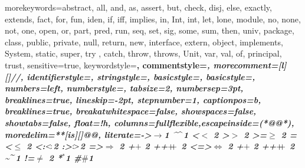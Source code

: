 {morekeywords={abstract, all, and, as, assert, but, check, disj, else, exactly, extends, fact, for, fun, iden, if, iff, implies, in, Int, int, let, lone, module, no, none, not, one, open, or, part, pred, run, seq, set, sig, some, sum, then, univ, package, class, public, private, null, return, new, interface, extern, object, implements, System, static, super, try , catch, throw, throws, Unit, var, val, of, principal, trust},
sensitive=true,
keywordstyle=\bfseries\color{green!40!black},
commentstyle=\itshape\color{purple!40!black},
morecomment=[l][\small\itshape\color{purple!40!black}]{//},
identifierstyle=\color{blue},
stringstyle=\color{orange},
basicstyle=\small,
basicstyle={\small\ttfamily},
numbers=left,
numberstyle=\tiny\color{mygray},
tabsize=2,
numbersep=3pt,
breaklines=true,
lineskip=-2pt,
stepnumber=1,
captionpos=b,
breaklines=true,
breakatwhitespace=false,
showspaces=false,
showtabs=false,
float=!h,
columns=fullflexible,escapeinside={(*@}{@*)},
moredelim=**[is][\color{red!60}]{@}{@},
literate={->}{{$\to$}}1 {^}{{$\mspace{-3mu}\widehat{\quad}\mspace{-3mu}$}}1
{<}{$<$ }2 {>}{$>$ }2 {>=}{$\geq$ }2 {=<}{$\leq$ }2
{<:}{{$<\mspace{-3mu}:$}}2 {:>}{{$:\mspace{-3mu}>$}}2
{=>}{{$\Rightarrow$ }}2 {+}{$+$ }2 {++}{{$+\mspace{-8mu}+$ }}2
{<=>}{{$\Leftrightarrow$ }}2 {+}{$+$ }2 {++}{{$+\mspace{-8mu}+$ }}2
{\~}{{$\mspace{-3mu}\widetilde{\quad}\mspace{-3mu}$}}1
{!=}{$\neq$ }2 {*}{${}^{\ast}$}1 %
{\#}{$\#$}1
}
\lstset{language=Java,numbersep=5pt,frame=single}

\DeclareMathOperator\niff{\ensuremath{\nLeftrightarrow}}

\DeclareMathOperator\ceq{\ensuremath{\mathrel{\simeq_{\mi{ctx}}}}}
\DeclareMathOperator\nceq{\mathrel{\not\simeq_{\mi{ctx}}}}

\DeclareMathOperator\ceqs{\src{\ceq}}
\DeclareMathOperator\ceqt{\trg{\ceq}}
\DeclareMathOperator\ceqc{\com{\ceq}}

\DeclareMathOperator\nceqs{\src{\nceq}}
\DeclareMathOperator\nceqt{\trg{\nceq}}

